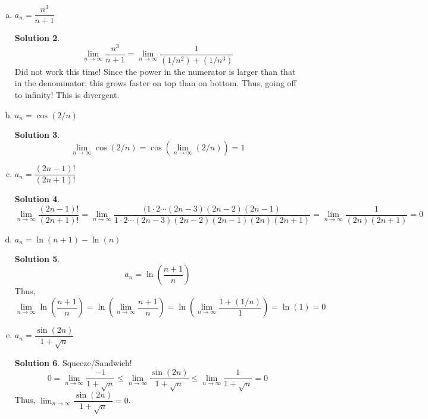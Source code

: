 \documentclass[10pt]{article}
\theoremstyle{Theorem}
\theoremstyle{definition}
\newtheorem*{solution}{Solution}
\theoremstyle{remark}
\theoremstyle{custom}
\begin{document}
\begin{enumerate}[1.]
\begin{enumerate}[a.]
\begin{solution}
\[
\lim_{n\rightarrow \infty} \dfrac{n^3}{n^3+1}=\lim_{n\rightarrow \infty} \dfrac{1}{1+(1/n^3)}=1
\]
Thus, Convergent to 1.
\end{solution}
\item $a_n=\dfrac{n^3}{n+1}$
\begin{solution}
\[
\lim_{n\rightarrow \infty} \dfrac{n^3}{n+1}=\lim_{n\rightarrow \infty} \dfrac{1}{(1/n^2)+(1/n^3)}
\]
Did not work this time! Since the power in the numerator is larger than that in the denominator, this grows faster on top than on bottom. Thus, going off to infinity! This is divergent.
\end{solution}
\item $a_n=\cos(2/n)$
\begin{solution}
\[
\lim_{n\rightarrow \infty} \cos(2/n)=\cos\left(\lim_{n\rightarrow \infty}(2/n)\right)=1
\]
\end{solution}
\item $a_n= \dfrac{(2n-1)!}{(2n+1)!}$
\begin{solution}
\[
\lim_{n\rightarrow \infty}  \dfrac{(2n-1)!}{(2n+1)!}=\lim_{n\rightarrow \infty} \dfrac{(1\cdot 2\cdots (2n-3)(2n-2)(2n-1)}{1\cdot 2\cdots (2n-3)(2n-2)(2n-1)(2n)(2n+1)}=\lim_{n\rightarrow \infty} \dfrac{1}{(2n)(2n+1)}=0
\]
\end{solution}
\item $a_n=\ln(n+1)-\ln(n)$
\begin{solution}
\[
a_n=\ln\left(\dfrac{n+1}{n}\right)
\]
Thus, 
\[
\lim_{n\rightarrow \infty} \ln\left(\dfrac{n+1}{n}\right)=\ln\left(\lim_{n\rightarrow \infty} 
\dfrac{n+1}{n}\right)=\ln\left(\lim_{n\rightarrow \infty} \dfrac{1+(1/n)}{1}\right)=\ln(1)=0
\]
\end{solution}
\item $a_n=\dfrac{\sin(2n)}{1+\sqrt{n}}$
\begin{solution}
Squeeze/Sandwich!
\[
0=\lim_{n\rightarrow \infty} \dfrac{-1}{1+\sqrt{n}}\leq \lim_{n\rightarrow \infty} \dfrac{\sin(2n)}{1+\sqrt{n}}\leq \lim_{n\rightarrow \infty} \dfrac{1}{1+\sqrt{n}}=0
\]
Thus, $\lim_{n\rightarrow \infty} \dfrac{\sin(2n)}{1+\sqrt{n}}=0$.
\end{solution}
\end{enumerate}
\end{enumerate}
\end{document}
